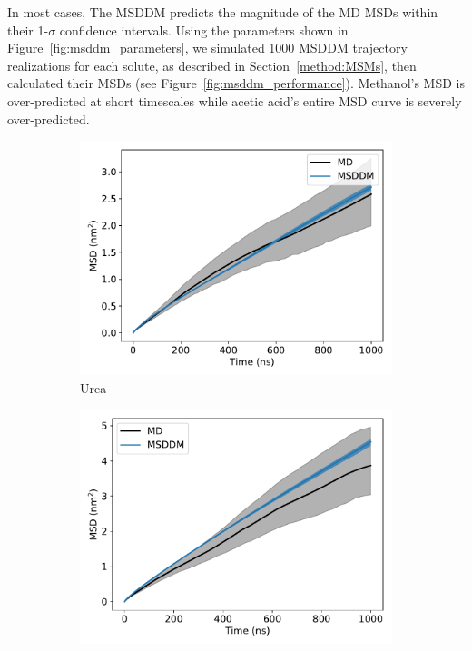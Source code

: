 \documentclass{article}
\begin{document}
  In most cases, The MSDDM predicts the magnitude of the MD MSDs within their 
  1-$\sigma$ confidence intervals. Using the parameters shown in 
  Figure~\ref{fig:msddm_parameters}, we simulated 1000 MSDDM trajectory 
  realizations for each solute, as described in Section~\ref{method:MSMs},
  then calculated their MSDs (see Figure~\ref{fig:msddm_performance}). Methanol's
  MSD is over-predicted at short timescales while acetic acid's entire MSD 
  curve is severely over-predicted.
  
  \begin{figure}
  \centering
  \begin{subfigure}{0.45\textwidth}
  \includegraphics[width=\textwidth]{URE_msddm.pdf}
  \caption{Urea}\label{fig:URE_msddm}
  \end{subfigure}
  \begin{subfigure}{0.45\textwidth}
  \includegraphics[width=\textwidth]{GCL_msddm.pdf}

\end{subfigure}
\end{figure}
\end{document}
